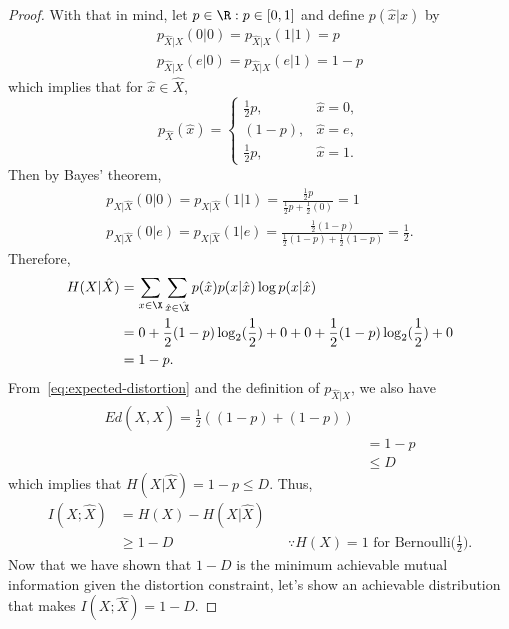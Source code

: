\documentclass[
  coursecode={MTHE 477},
  assignmentname={Homework \homeworknumber},
  studentnumber=20053722,
  name={Bryan Hoang},
  draft,
]{
  ltxanswer%
}
\begin{document}
\begin{questions}
\begin{solution}
\begin{claim}
\begin{proof}
          With that in mind, let \(p\in\R : p\in[0,1]\) and define \(p(\hat{x}|x)\) by
          \begin{gather*}
            p_{\hat{X}|X}(0|0) = p_{\hat{X}|X}(1|1) = p \\
            p_{\hat{X}|X}(e|0) = p_{\hat{X}|X}(e|1) = 1 - p
          \end{gather*}
          which implies that for \(\hat{x}\in\hat{X}\),
          \begin{equation*}
            p_{\hat{X}}(\hat{x}) = \begin{cases}
              \frac{1}{2}p, &\hat{x} = 0, \\
              (1-p),        &\hat{x} = e, \\
              \frac{1}{2}p, &\hat{x} = 1.
            \end{cases}
          \end{equation*}
          Then by Bayes' theorem,
          \begin{gather*}
            p_{X|\hat{X}}(0|0) = p_{X|\hat{X}}(1|1) = \frac{\frac{1}{2}p}{\frac{1}{2}p + \frac{1}{2}(0)} = 1 \\
            p_{X|\hat{X}}(0|e) = p_{X|\hat{X}}(1|e) = \frac{\frac{1}{2}(1-p)}{\frac{1}{2}(1-p) + \frac{1}{2}(1-p)} = \frac{1}{2}.
          \end{gather*}
          Therefore,
          \begin{align*}
            H(X|\hat{X}) &= \sum_{x\in\X} \sum_{\hat{x}\in\hat{\X}} p(\hat{x}) p(x|\hat{x}) \log p(x|\hat{x})                 \\
                         &= 0 + \frac{1}{2} (1-p) \log_{2}(\frac{1}{2}) + 0 + 0 + \frac{1}{2} (1-p) \log_{2}(\frac{1}{2}) + 0 \\
                         &= 1 - p.
          \end{align*}
          From~\eqref{eq:expected-distortion} and the definition of \(p_{\hat{X}|X}\), we also have
          \begin{align*}
            Ed(X,\hat{X}) = \frac{1}{2}((1-p) + (1-p)) \\
             &= 1-p                                    \\
             &\le D
          \end{align*}
          which implies that \(H(X|\hat{X}) = 1-p \le D\). Thus,
          \begin{align*}
            I(X;\hat{X}) &= H(X) - H(X|\hat{X})                                                               \\
                         &\ge 1 - D             & &\because \text{\(H(X)=1\) for Bernoulli(\(\frac{1}{2}\)).}
          \end{align*}
          Now that we have shown that \(1 - D\) is the minimum achievable mutual information given the distortion constraint, let's show an achievable distribution that makes \(I(X;\hat{X})=1-D\).


\end{proof}
\end{claim}
\end{solution}
\end{questions}
\end{document}
